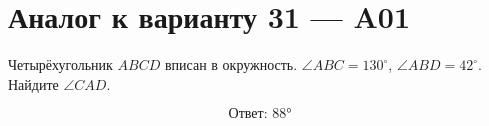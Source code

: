


\section*{Аналог к варианту 31 — A01}
Четырёхугольник \(ABCD\) вписан в окружность. \(\angle ABC=130^\circ\), \(\angle ABD=42^\circ\). Найдите \(\angle CAD\).
\begin{center}\figCyclicChord\end{center}
\[\boxed{\text{Ответ: }88°}\]

